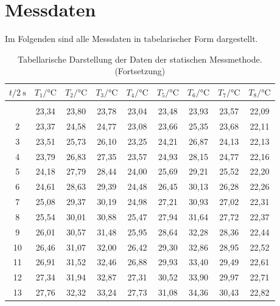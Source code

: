 \section{Messdaten}
\label{sec:Messdaten}
Im Folgenden sind alle Messdaten in tabelarischer Form dargestellt.
      \begin{longtable}{c c c c c c c c c}
        \caption{Tabellarische Darstellung der Daten der statischen Messmethode.}\label{tab:data statisch}\\
        \hline
        {$t / \qty{2}{\second}$} & {$T_{1} / \unit{\celsius}$} & {$T_{2} / \unit{\celsius}$} &%
        {$T_{3} / \unit{\celsius}$} & {$T_{4} / \unit{\celsius}$} &%
        {$T_{5} / \unit{\celsius}$} & {$T_{6} / \unit{\celsius}$} &%
        {$T_{7} / \unit{\celsius}$} & {$T_{8} / \unit{\celsius}$} \\
        \hline
        \endfirsthead
        \caption[]{Tabellarische Darstellung der Daten der statischen Messmethode. (Fortsetzung)}\\
        \hline
        \endhead
        \hline
        \endfoot
      1	  & 23,34	& 23,80	& 23,78	& 23,04	& 23,48	& 23,93	& 23,57	& 22,09 \\
      2	  & 23,37	& 24,58	& 24,77	& 23,08	& 23,66	& 25,35	& 23,68	& 22,11 \\
      3	  & 23,51	& 25,73	& 26,10	& 23,25	& 24,21	& 26,87	& 24,13	& 22,13 \\
      4	  & 23,79	& 26,83	& 27,35	& 23,57	& 24,93	& 28,15	& 24,77	& 22,16 \\
      5	  & 24,18	& 27,79	& 28,44	& 24,00	& 25,69	& 29,21	& 25,52	& 22,20 \\
      6	  & 24,61	& 28,63	& 29,39	& 24,48	& 26,45	& 30,13	& 26,28	& 22,26 \\
      7	  & 25,08	& 29,37	& 30,19	& 24,98	& 27,21	& 30,93	& 27,02	& 22,31 \\
      8	  & 25,54	& 30,01	& 30,88	& 25,47	& 27,94	& 31,64	& 27,72	& 22,37 \\
      9	  & 26,01	& 30,57	& 31,48	& 25,95	& 28,64	& 32,28	& 28,36	& 22,44 \\
      10	& 26,46	& 31,07	& 32,00	& 26,42	& 29,30	& 32,86	& 28,95	& 22,52 \\
      11	& 26,91	& 31,52	& 32,46	& 26,88	& 29,93	& 33,40	& 29,49	& 22,61 \\
      12	& 27,34	& 31,94	& 32,87	& 27,31	& 30,52	& 33,90	& 29,97	& 22,71 \\
      13	& 27,76	& 32,32	& 33,24	& 27,73	& 31,08	& 34,36	& 30,43	& 22,82 \\

\end{longtable}
